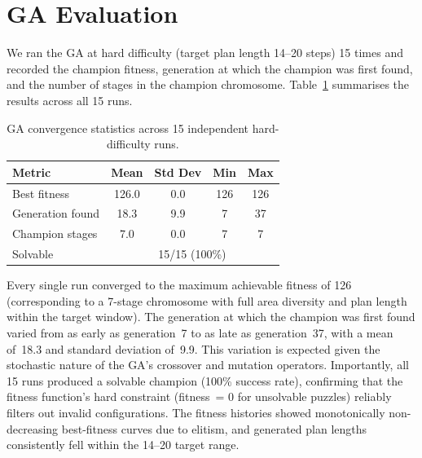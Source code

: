 \documentclass[12pt, a4paper]{report}
\begin{document}
\section{GA Evaluation}

We ran the GA at hard difficulty (target plan length 14--20 steps) 15 times and recorded the champion fitness, generation at which the champion was first found, and the number of stages in the champion chromosome.  Table~\ref{tab:ga15runs} summarises the results across all 15 runs.

\begin{table}[H]
\centering
\caption{GA convergence statistics across 15 independent hard-difficulty runs.}
\label{tab:ga15runs}
\begin{tabular}{lcccc}
\toprule
\textbf{Metric} & \textbf{Mean} & \textbf{Std Dev} & \textbf{Min} & \textbf{Max} \\
\midrule
Best fitness          & 126.0 & 0.0  & 126 & 126 \\
Generation found      & 18.3  & 9.9  & 7   & 37  \\
Champion stages       & 7.0   & 0.0  & 7   & 7   \\
Solvable              & \multicolumn{4}{c}{15/15 (100\%)} \\
\bottomrule
\end{tabular}
\end{table}

Every single run converged to the maximum achievable fitness of 126 (corresponding to a 7-stage chromosome with full area diversity and plan length within the target window).  The generation at which the champion was first found varied from as early as generation~7 to as late as generation~37, with a mean of~18.3 and standard deviation of~9.9.  This variation is expected given the stochastic nature of the GA's crossover and mutation operators.  Importantly, all 15 runs produced a solvable champion (100\% success rate), confirming that the fitness function's hard constraint (fitness~= 0 for unsolvable puzzles) reliably filters out invalid configurations.  The fitness histories showed monotonically non-decreasing best-fitness curves due to elitism, and generated plan lengths consistently fell within the 14--20 target range.
\end{document}
